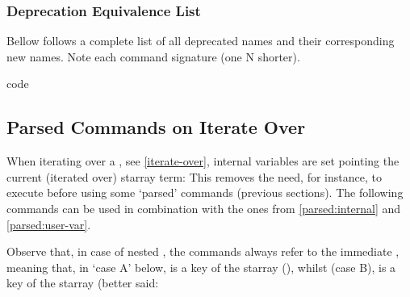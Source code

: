 \documentclass[10pt]{article}
\begin{document}
\subsubsection{Deprecation Equivalence List}
Bellow follows a complete list of all deprecated names and their corresponding new names. Note each command signature (one N shorter).
\begin{describelist*}[60mm]{code}
              {}
            {}
           {}
           {}
           {}
          {}
        {}
            {}
           {}
         {}
          {}
         {}
       {}
     {}
   {}
\end{describelist*}


\subsection{Parsed Commands on Iterate Over}\label{parsed:iter-over}
When iterating over a , see \ref{iterate-over}, internal variables are set pointing the current (iterated over) starray term: This removes the need, for instance, to execute  before using some `parsed' commands (previous sections). The following commands can be used in combination with the ones from \ref{parsed:internal} and \ref{parsed:user-var}.

Observe that, in case of nested , the  commands always refer to the immediate , meaning that, in `case A' below,  is a key of the starray  (), whilst (case B),  is a key of the starray  (better said: 
\end{document}
